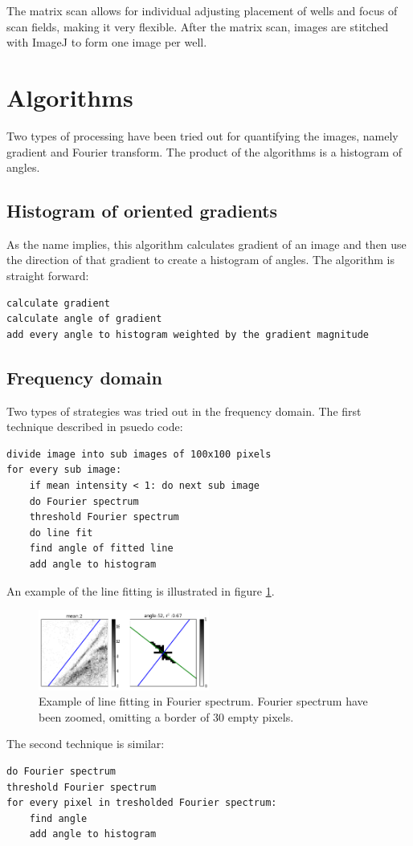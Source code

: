 The matrix scan allows for individual adjusting placement of wells and focus of scan fields, making it very flexible. After the matrix scan, images are stitched with ImageJ to form one image per well.


%
%
\section{Algorithms}
Two types of processing have been tried out for quantifying the images, namely gradient and Fourier transform. The product of the algorithms is a histogram of angles.


\subsection{Histogram of oriented gradients}
As the name implies, this algorithm calculates gradient of an image and then use the direction of that gradient to create a histogram of angles. The algorithm is straight forward:

\begin{lstlisting}
calculate gradient
calculate angle of gradient
add every angle to histogram weighted by the gradient magnitude
\end{lstlisting}


\subsection{Frequency domain}
Two types of strategies was tried out in the frequency domain. The first technique described in psuedo code:

\begin{lstlisting}
divide image into sub images of 100x100 pixels
for every sub image:
    if mean intensity < 1: do next sub image
    do Fourier spectrum
    threshold Fourier spectrum
    do line fit
    find angle of fitted line
    add angle to histogram
\end{lstlisting}

An example of the line fitting is illustrated in figure \ref{fig:ft_good}.

\begin{figure}[h]
\centering
\includegraphics[width=0.5\textwidth]{ft_line_good}
\caption{Example of line fitting in Fourier spectrum. Fourier spectrum have been zoomed, omitting a border of 30 empty pixels.}
\label{fig:ft_good}
\end{figure}

The second technique is similar:

\begin{lstlisting}
do Fourier spectrum
threshold Fourier spectrum
for every pixel in tresholded Fourier spectrum:
    find angle
    add angle to histogram
\end{lstlisting}
